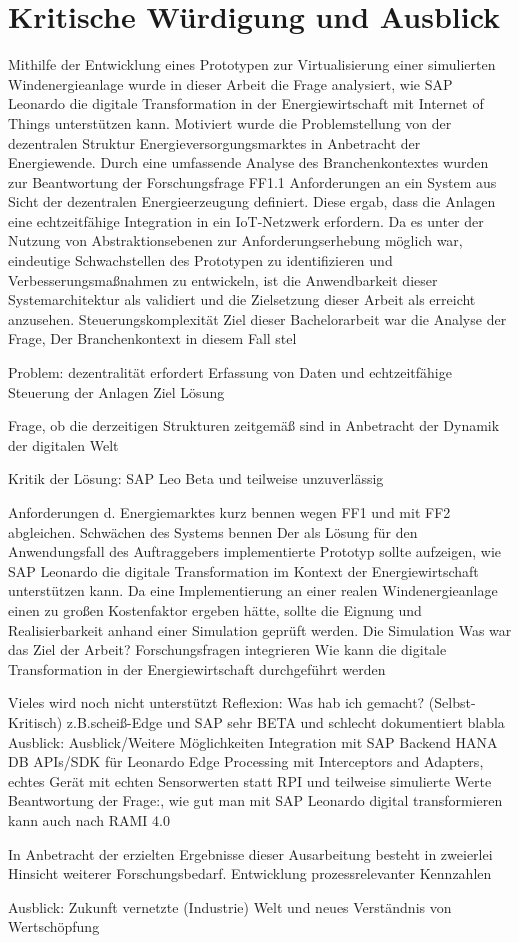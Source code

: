 \section{Kritische Würdigung und Ausblick}

Mithilfe der Entwicklung eines Prototypen zur Virtualisierung einer simulierten Windenergieanlage wurde in dieser Arbeit die Frage analysiert, wie SAP Leonardo die digitale Transformation in der Energiewirtschaft mit Internet of Things unterstützen kann. Motiviert wurde die Problemstellung von der dezentralen Struktur Energieversorgungsmarktes in Anbetracht der Energiewende. Durch eine umfassende Analyse des Branchenkontextes wurden zur Beantwortung der Forschungsfrage FF1.1 Anforderungen an ein System aus Sicht der dezentralen Energieerzeugung definiert. Diese ergab, dass die Anlagen eine echtzeitfähige Integration in ein IoT-Netzwerk erfordern.
Da es unter der Nutzung von Abstraktionsebenen zur Anforderungserhebung möglich war, eindeutige Schwachstellen des Prototypen zu identifizieren und Verbesserungsmaßnahmen zu entwickeln, ist die Anwendbarkeit dieser Systemarchitektur als validiert und die Zielsetzung dieser Arbeit als erreicht anzusehen.
Steuerungskomplexität 
Ziel dieser Bachelorarbeit war die Analyse der Frage,  Der Branchenkontext in diesem Fall stel

Problem: dezentralität erfordert Erfassung von Daten und echtzeitfähige Steuerung der Anlagen 
Ziel
Lösung

Frage, ob die derzeitigen Strukturen zeitgemäß sind in Anbetracht der Dynamik der digitalen Welt

Kritik der Lösung: SAP Leo Beta und teilweise unzuverlässig

Anforderungen d. Energiemarktes kurz bennen wegen FF1 und mit FF2 abgleichen. Schwächen des Systems bennen 
Der als Lösung für den Anwendungsfall des Auftraggebers implementierte Prototyp sollte aufzeigen, wie SAP Leonardo die digitale Transformation im Kontext der Energiewirtschaft unterstützen kann. Da eine Implementierung an einer realen Windenergieanlage einen zu großen Kostenfaktor ergeben hätte, sollte die Eignung und Realisierbarkeit anhand einer Simulation geprüft werden. Die Simulation 
Was war das Ziel der Arbeit? Forschungsfragen integrieren
Wie kann die digitale Transformation in der Energiewirtschaft durchgeführt werden

Vieles wird noch nicht unterstützt
Reflexion:
Was hab ich gemacht? (Selbst-Kritisch) z.B.scheiß-Edge und SAP sehr BETA und schlecht dokumentiert blabla
\newline
Ausblick:
Ausblick/Weitere Möglichkeiten
Integration mit SAP Backend
HANA DB
APIs/SDK für Leonardo
Edge Processing mit Interceptors and Adapters, echtes Gerät mit echten Sensorwerten statt RPI und teilweise simulierte Werte
\newline
Beantwortung der Frage:, wie gut man mit SAP Leonardo digital transformieren kann auch nach RAMI 4.0


In Anbetracht der erzielten Ergebnisse dieser Ausarbeitung besteht in zweierlei Hinsicht weiterer Forschungsbedarf. 
Entwicklung prozessrelevanter Kennzahlen

Ausblick: Zukunft vernetzte (Industrie) Welt und neues Verständnis von Wertschöpfung
\newpage
